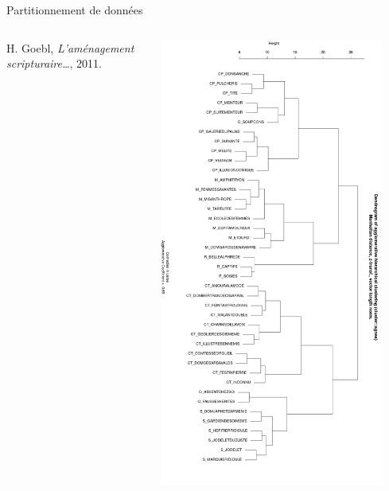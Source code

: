 \documentclass[ignorenonframetext]{beamer}
\begin{document}
\begin{frame}{Partitionnement de données}
\begin{columns}
\begin{column}{0.5\textwidth}
			{\small H. Goebl, \textit{L'aménagement scripturaire…}, 2011.}
		\end{column}
		\begin{column}{0.45\textwidth}
			\includegraphics[width=0.9\textwidth]{img/CAH_Manhattan.png}
		\end{column}
	\end{columns}
\end{frame}
\end{document}
